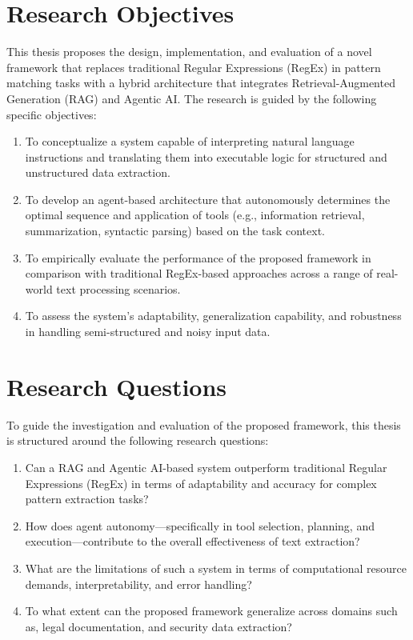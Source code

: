 \section{Research Objectives}


This thesis proposes the design, implementation, and evaluation of a novel framework that replaces traditional Regular Expressions (RegEx) in pattern matching tasks with a hybrid architecture that integrates Retrieval-Augmented Generation (RAG) and Agentic AI. The research is guided by the following specific objectives:

\begin{enumerate}
    \item To conceptualize a system capable of interpreting natural language instructions and translating them into executable logic for structured and unstructured data extraction.
    
    \item To develop an agent-based architecture that autonomously determines the optimal sequence and application of tools (e.g., information retrieval, summarization, syntactic parsing) based on the task context.
    
    \item To empirically evaluate the performance of the proposed framework in comparison with traditional RegEx-based approaches across a range of real-world text processing scenarios.
    
    \item To assess the system’s adaptability, generalization capability, and robustness in handling semi-structured and noisy input data.
\end{enumerate}



\section{Research Questions}

To guide the investigation and evaluation of the proposed framework, this thesis is structured around the following research questions:

\begin{enumerate}
    \item Can a RAG and Agentic AI-based system outperform traditional Regular Expressions (RegEx) in terms of adaptability and accuracy for complex pattern extraction tasks?

    \item How does agent autonomy—specifically in tool selection, planning, and execution—contribute to the overall effectiveness of text extraction?

    \item What are the limitations of such a system in terms of computational resource demands, interpretability, and error handling?

    \item To what extent can the proposed framework generalize across domains such as, legal documentation, and security data extraction?
\end{enumerate}

